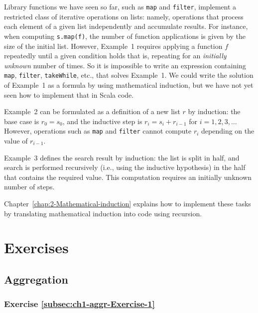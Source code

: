 Library functions we have seen so far, such as \texttt{}\lstinline!map!
and \lstinline!filter!, implement a restricted class of iterative
operations on lists: namely, operations that process each element
of a given list independently and accumulate results. For instance,
when computing \lstinline!s.map(f)!, the number of function applications
is given by the size of the initial list. However, Example\ 1 requires
applying a function $f$ repeatedly until a given condition holds
\textemdash{} that is, repeating for an \emph{initially unknown} number
of times. So it is impossible to write an expression containing \lstinline!map!,
\lstinline!filter!, \lstinline!takeWhile!, etc., that solves Example\ 1.
We could write the solution of Example\ 1 as a formula by using mathematical
induction, but we have not yet seen how to implement that in Scala
code. 

Example\ 2 can be formulated as a definition of a new list $r$ by
induction: the base case is $r_{0}=s_{0}$, and the inductive step
is $r_{i}=s_{i}+r_{i-1}$ for $i=1,2,3,...$ However, operations such
as \texttt{}\lstinline!map! and \texttt{}\lstinline!filter! cannot
compute $r_{i}$ depending on the value of $r_{i-1}$.

Example\ 3 defines the search result by induction: the list is split
in half, and search is performed recursively (i.e., using the inductive
hypothesis) in the half that contains the required value. This computation
requires an initially unknown number of steps.

Chapter\ \ref{chap:2-Mathematical-induction} explains how to implement
these tasks by translating mathematical induction into code using
recursion.

\section{Exercises\label{sec:beginner-Exercises}}

\subsection{Aggregation}

\subsubsection{Exercise \label{subsec:ch1-aggr-Exercise-1}\ref{subsec:ch1-aggr-Exercise-1}}

